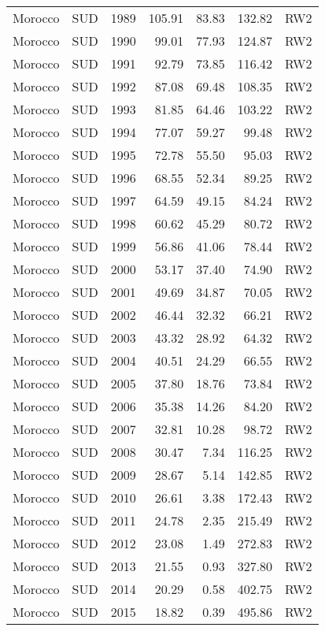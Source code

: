 \begin{longtable}{lllrrrl}
  Morocco & SUD & 1989 & 105.91 & 83.83 & 132.82 & RW2 \\ 
  Morocco & SUD & 1990 & 99.01 & 77.93 & 124.87 & RW2 \\ 
  Morocco & SUD & 1991 & 92.79 & 73.85 & 116.42 & RW2 \\ 
  Morocco & SUD & 1992 & 87.08 & 69.48 & 108.35 & RW2 \\ 
  Morocco & SUD & 1993 & 81.85 & 64.46 & 103.22 & RW2 \\ 
  Morocco & SUD & 1994 & 77.07 & 59.27 & 99.48 & RW2 \\ 
  Morocco & SUD & 1995 & 72.78 & 55.50 & 95.03 & RW2 \\ 
  Morocco & SUD & 1996 & 68.55 & 52.34 & 89.25 & RW2 \\ 
  Morocco & SUD & 1997 & 64.59 & 49.15 & 84.24 & RW2 \\ 
  Morocco & SUD & 1998 & 60.62 & 45.29 & 80.72 & RW2 \\ 
  Morocco & SUD & 1999 & 56.86 & 41.06 & 78.44 & RW2 \\ 
  Morocco & SUD & 2000 & 53.17 & 37.40 & 74.90 & RW2 \\ 
  Morocco & SUD & 2001 & 49.69 & 34.87 & 70.05 & RW2 \\ 
  Morocco & SUD & 2002 & 46.44 & 32.32 & 66.21 & RW2 \\ 
  Morocco & SUD & 2003 & 43.32 & 28.92 & 64.32 & RW2 \\ 
  Morocco & SUD & 2004 & 40.51 & 24.29 & 66.55 & RW2 \\ 
  Morocco & SUD & 2005 & 37.80 & 18.76 & 73.84 & RW2 \\ 
  Morocco & SUD & 2006 & 35.38 & 14.26 & 84.20 & RW2 \\ 
  Morocco & SUD & 2007 & 32.81 & 10.28 & 98.72 & RW2 \\ 
  Morocco & SUD & 2008 & 30.47 & 7.34 & 116.25 & RW2 \\ 
  Morocco & SUD & 2009 & 28.67 & 5.14 & 142.85 & RW2 \\ 
  Morocco & SUD & 2010 & 26.61 & 3.38 & 172.43 & RW2 \\ 
  Morocco & SUD & 2011 & 24.78 & 2.35 & 215.49 & RW2 \\ 
  Morocco & SUD & 2012 & 23.08 & 1.49 & 272.83 & RW2 \\ 
  Morocco & SUD & 2013 & 21.55 & 0.93 & 327.80 & RW2 \\ 
  Morocco & SUD & 2014 & 20.29 & 0.58 & 402.75 & RW2 \\ 
  Morocco & SUD & 2015 & 18.82 & 0.39 & 495.86 & RW2 \\ 

\end{longtable}

